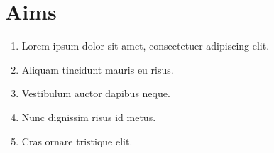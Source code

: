 \section{Aims}

\begin{enumerate}
    \item Lorem ipsum dolor sit amet, consectetuer adipiscing elit.
    \item Aliquam tincidunt mauris eu risus.
    \item Vestibulum auctor dapibus neque.
    \item Nunc dignissim risus id metus.
    \item Cras ornare tristique elit.
\end{enumerate}